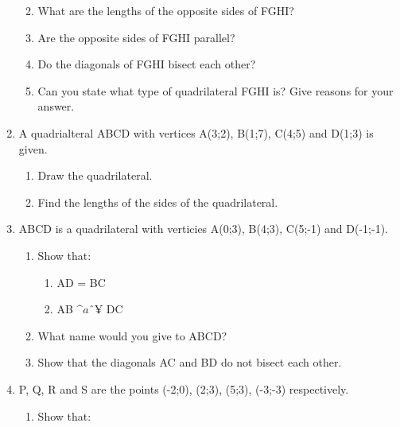 \begin{enumerate}[noitemsep, label=\textbf{\arabic*}. ]
\begin{enumerate}[noitemsep, label=\textbf{\alph*}. ]
            \label{m39167*uid47}\item 
What are the lengths of the opposite sides of FGHI?
\label{m39167*uid48}\item Are the opposite sides of FGHI parallel?
\label{m39167*uid49}\item  Do the diagonals of FGHI bisect each other?
\label{m39167*uid50}\item  Can you state what type of quadrilateral FGHI is? Give reasons for your answer.
\end{enumerate}
                \label{m39167*uid51}\item 
A quadrialteral ABCD with vertices A(3;2), B(1;7), C(4;5) and D(1;3) is given.
\label{m39167*id69770}\begin{enumerate}[noitemsep, label=\textbf{\alph*}. ] 
            \label{m39167*uid52}\item  Draw the quadrilateral.
\label{m39167*uid53}\item  Find the lengths of the sides of the quadrilateral.
\end{enumerate}
                \label{m39167*uid54}\item ABCD is a quadrilateral with verticies A(0;3), B(4;3), C(5;-1) and D(-1;-1).
\label{m39167*id69816}\begin{enumerate}[noitemsep, label=\textbf{\alph*}. ] 
            \label{m39167*uid55}\item Show that:
\label{m39167*id69834}\begin{enumerate}[noitemsep, label=\textbf{\roman*}. ] 
            \label{m39167*uid56}\item AD = BC
\label{m39167*uid57}\item AB \begin{math}\^{a}ˆ¥\end{math} DC
\end{enumerate}
        \label{m39167*uid58}\item What name would you give to ABCD?
\label{m39167*uid59}\item Show that the diagonals AC and BD do not bisect each other.
\end{enumerate}
                \label{m39167*uid60}\item P, Q, R and S are the points (-2;0), (2;3), (5;3), (-3;-3) respectively.
\label{m39167*id69919}\begin{enumerate}[noitemsep, label=\textbf{\alph*}. ] 
            \label{m39167*uid61}\item Show that:
\label{m39167*id69937}\begin{enumerate}[noitemsep, label=\textbf{\roman*}. ] 

\end{enumerate}
\end{enumerate}
\end{enumerate}
